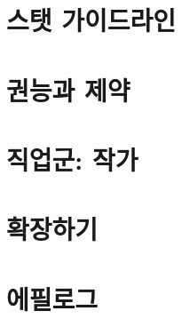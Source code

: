 \documentclass{report}
\begin{document}
	\chapter{스탯 가이드라인}
	
	
	\chapter{권능과 제약}
	
	
	\chapter{직업군: 작가}
	
	
	\chapter{확장하기}
	
	
	\chapter{에필로그}
	
\end{document}
